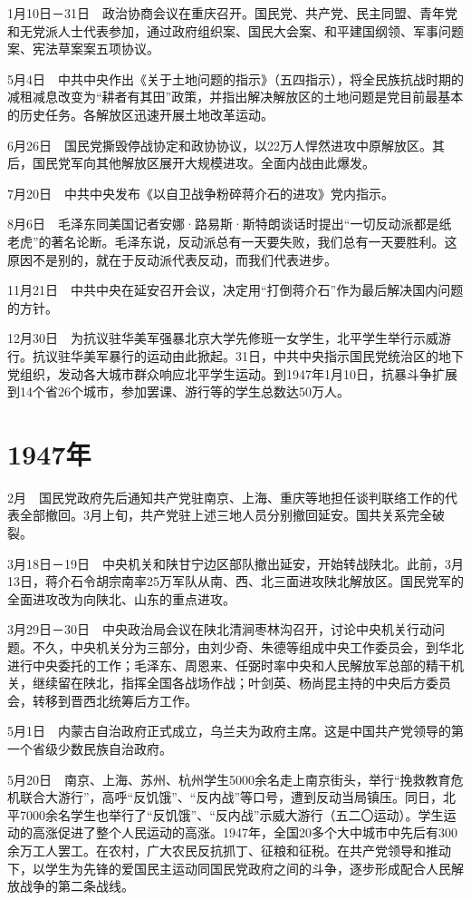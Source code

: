 \documentclass[10pt,a4paper,twocolumn]{book}
\begin{document}
1月10日－31日　政治协商会议在重庆召开。国民党、共产党、民主同盟、青年党和无党派人士代表参加，通过政府组织案、国民大会案、和平建国纲领、军事问题案、宪法草案案五项协议。

5月4日　中共中央作出《关于土地问题的指示》（五四指示），将全民族抗战时期的减租减息改变为“耕者有其田”政策，并指出解决解放区的土地问题是党目前最基本的历史任务。各解放区迅速开展土地改革运动。

6月26日　国民党撕毁停战协定和政协协议，以22万人悍然进攻中原解放区。其后，国民党军向其他解放区展开大规模进攻。全面内战由此爆发。

7月20日　中共中央发布《以自卫战争粉碎蒋介石的进攻》党内指示。

8月6日　毛泽东同美国记者安娜·路易斯·斯特朗谈话时提出“一切反动派都是纸老虎”的著名论断。毛泽东说，反动派总有一天要失败，我们总有一天要胜利。这原因不是别的，就在于反动派代表反动，而我们代表进步。

11月21日　中共中央在延安召开会议，决定用“打倒蒋介石”作为最后解决国内问题的方针。

12月30日　为抗议驻华美军强暴北京大学先修班一女学生，北平学生举行示威游行。抗议驻华美军暴行的运动由此掀起。31日，中共中央指示国民党统治区的地下党组织，发动各大城市群众响应北平学生运动。到1947年1月10日，抗暴斗争扩展到14个省26个城市，参加罢课、游行等的学生总数达50万人。

\section{1947年}

2月　国民党政府先后通知共产党驻南京、上海、重庆等地担任谈判联络工作的代表全部撤回。3月上旬，共产党驻上述三地人员分别撤回延安。国共关系完全破裂。

3月18日－19日　中央机关和陕甘宁边区部队撤出延安，开始转战陕北。此前，3月13日，蒋介石令胡宗南率25万军队从南、西、北三面进攻陕北解放区。国民党军的全面进攻改为向陕北、山东的重点进攻。

3月29日－30日　中央政治局会议在陕北清涧枣林沟召开，讨论中央机关行动问题。不久，中央机关分为三部分，由刘少奇、朱德等组成中央工作委员会，到华北进行中央委托的工作；毛泽东、周恩来、任弼时率中央和人民解放军总部的精干机关，继续留在陕北，指挥全国各战场作战；叶剑英、杨尚昆主持的中央后方委员会，转移到晋西北统筹后方工作。

5月1日　内蒙古自治政府正式成立，乌兰夫为政府主席。这是中国共产党领导的第一个省级少数民族自治政府。

5月20日　南京、上海、苏州、杭州学生5000余名走上南京街头，举行“挽救教育危机联合大游行”，高呼“反饥饿”、“反内战”等口号，遭到反动当局镇压。同日，北平7000余名学生也举行了“反饥饿”、“反内战”示威大游行（五二〇运动）。学生运动的高涨促进了整个人民运动的高涨。1947年，全国20多个大中城市中先后有300余万工人罢工。在农村，广大农民反抗抓丁、征粮和征税。在共产党领导和推动下，以学生为先锋的爱国民主运动同国民党政府之间的斗争，逐步形成配合人民解放战争的第二条战线。
\end{document}
